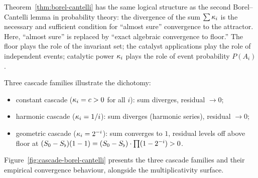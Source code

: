 \begin{remark}\label{rem:borel-cantelli-analogy}
Theorem~\ref{thm:borel-cantelli} has the same logical structure as the second Borel--Cantelli lemma in probability theory: the divergence of the sum $\sum \kappa_i$ is the necessary and sufficient condition for ``almost sure'' convergence to the attractor. Here, ``almost sure'' is replaced by ``exact algebraic convergence to floor.'' The floor plays the role of the invariant set; the catalyst applications play the role of independent events; catalytic power $\kappa_i$ plays the role of event probability $P(A_i)$.

Three cascade families illustrate the dichotomy:
\begin{itemize}[nosep]
  \item constant cascade ($\kappa_i = c > 0$ for all $i$): sum diverges, residual $\to 0$;
  \item harmonic cascade ($\kappa_i = 1/i$): sum diverges (harmonic series), residual $\to 0$;
  \item geometric cascade ($\kappa_i = 2^{-i}$): sum converges to $1$, residual levels off above floor at $(S_0 - S_{\flat})(1 - 1) = (S_0 - S_{\flat}) \cdot \prod(1 - 2^{-i}) > 0$.
\end{itemize}
\end{remark}

Figure~\ref{fig:cascade-borel-cantelli} presents the three cascade families and their empirical convergence behaviour, alongside the multiplicativity surface.

